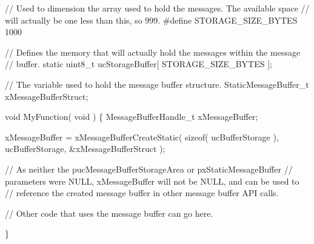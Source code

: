 \begin{DoxyPre}// Used to dimension the array used to hold the messages.  The available space
// will actually be one less than this, so 999.
#define STORAGE\_SIZE\_BYTES 1000\end{DoxyPre}



\begin{DoxyPre}// Defines the memory that will actually hold the messages within the message
// buffer.
static uint8\_t ucStorageBuffer[ STORAGE\_SIZE\_BYTES ];\end{DoxyPre}



\begin{DoxyPre}// The variable used to hold the message buffer structure.
StaticMessageBuffer\_t xMessageBufferStruct;\end{DoxyPre}



\begin{DoxyPre}void MyFunction( void )
\{
MessageBufferHandle\_t xMessageBuffer;
\begin{DoxyVerb}xMessageBuffer = xMessageBufferCreateStatic( sizeof( ucBufferStorage ),
                                             ucBufferStorage,
                                             &xMessageBufferStruct );

// As neither the pucMessageBufferStorageArea or pxStaticMessageBuffer
// parameters were NULL, xMessageBuffer will not be NULL, and can be used to
// reference the created message buffer in other message buffer API calls.

// Other code that uses the message buffer can go here.
\end{DoxyVerb}

\}\end{DoxyPre}



\begin{DoxyPre}\end{DoxyPre}
 